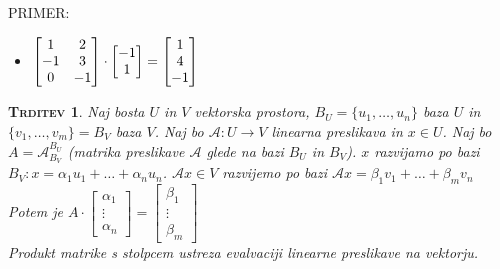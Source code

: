 \documentclass[a4paper,12pt]{article}
\newtheorem*{trditev}{\textsc{Trditev}}
\begin{document}
PRIMER:
\begin{itemize}
\item $\begin{bmatrix}
	1&2\\
	-1&3\\
	0&-1
\end{bmatrix} \cdot \begin{bmatrix}
	-1 \\
	1
\end{bmatrix} = \begin{bmatrix}
	1\\
	4\\
	-1
\end{bmatrix} \\$
\end{itemize}

\begin{trditev}
	Naj bosta $U$ in $V$ vektorska prostora, $B_U=\{u_1,\ldots,u_n\}$ baza $U$ in \linebreak $\{v_1,\ldots,v_m\}=B_V$ baza $V$. Naj bo $\mathcal{A}:U\to V$ linearna preslikava in $x\in U$. Naj bo \linebreak $A=\mathcal{A}_{B_V}^{B_U}$ (matrika preslikave $\mathcal{A}$ glede na bazi $B_U$ in $B_V$). $x$ razvijamo po bazi \linebreak  $B_V:x=\alpha_1u_1+\ldots+\alpha_nu_n$. $\mathcal{A}x\in V$ razvijemo po bazi $\mathcal{A}x=\beta_1v_1+\ldots+\beta_mv_n$ \\

	Potem je $A\cdot \begin{bmatrix}
		\alpha_1 \\ \vdots \\ \alpha_n
	\end{bmatrix} = \begin{bmatrix}
		\beta_1 \\ \vdots \\ \beta_m
	\end{bmatrix}$ \\

	Produkt matrike s stolpcem ustreza evalvaciji linearne preslikave na vektorju. \\
\end{trditev}
\end{document}

